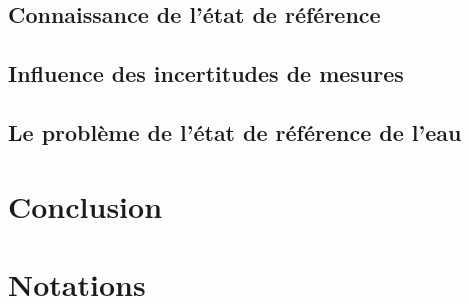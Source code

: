 \documentclass[a4paper,11pt]{scrartcl}
\begin{document}
\subsection{Connaissance de l'état de référence}

\subsection{Influence des incertitudes de mesures}

\subsection{Le problème de l'état de référence de l'eau}

\section{Conclusion}

\section*{Notations} \label{table-notations}
\end{document}

